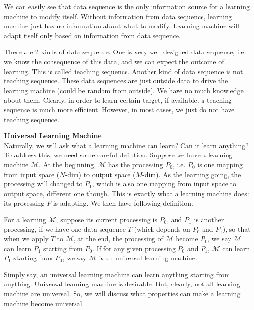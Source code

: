 We can easily see that data sequence is the only information source for a learning machine to modify itself. Without information from data sequence, learning machine just has no information about what to modify. Learning machine will adapt itself only based on information from data sequence. 

There are 2 kinds of data sequence. One is very well designed data sequence, i.e. we know the consequence of this data, and we can expect the outcome of learning. This is called teaching sequence. Another kind of data sequence is not teaching sequence. These data sequences are just outside data to drive the learning machine (could be random from outside). We have no much knowledge about them. Clearly, in order to learn certain target, if available, a teaching sequence is much more efficient. However, in most cases, we just do not have teaching sequence. 
\bigskip


{\bf Universal Learning Machine } \\
Naturally, we will ask what a learning machine can learn? Can it learn anything? To address this, we need some careful defintion. Suppose we have a learning machine $\mathcal{M}$. At the beginning, $\mathcal{M}$ has the processing $P_0$, i.e. $P_0$ is one mapping from input space ($N$-dim) to output space ($M$-dim). As the learning going, the processing will changed to $P_1$, which is also one mapping from input space to output space, different one though. This is exactly what a learning machine does: its processing $P$ is adapting. We then have following definition.


\begin{definition}
For a learning $\mathcal{M}$, suppose its current processing is $P_0$, and $P_1$ is another processing, if we have one data sequence $T$ (which depends on $P_0$ and $P_1$), so that when we apply $T$ to $\mathcal{M}$, at the end, the processing of $\mathcal{M}$ become $P_1$, we say $\mathcal{M}$ can learn $P_1$ starting from $P_0$. If for any given processing $P_0$ and $P_1$, $\mathcal{M}$ can learn $P_1$ starting from $P_0$, we say $\mathcal{M}$ is an universal learning machine. 
\end{definition}

Simply say, an universal learning machine can learn anything starting from anything. Universal learning machine is desirable. But, clearly, not all learning machine are universal. So, we will discuss what properties can make a learning machine become universal. 



